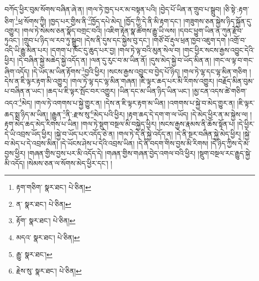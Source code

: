 བཀོད་ཕྱིར་བུམ་སོགས་བཞིན་ཞེ་ན། །གལ་ཏེ་ཁྱད་པར་མ་བསྟན་པའི། །བྱེད་པོ་ཡིན་ན་གྲུབ་པ་སྒྲུབ། །ཅི་སྟེ་:རྟག་ཅིག་\footnote{རྟག་གཅིག་  སྣར་ཐང་།  པེ་ཅིན། }ཕྲ་སོགས་ཀྱི། །ཁྱད་པར་གྱིས་ནི་\footnote{ན་  སྣར་ཐང་།  པེ་ཅིན། }ཁྱོད་དཔེ་མེད། །ཁྱོད་ཀྱི་དེ་ནི་མི་རྟག་དང་། །གཟུགས་ཅན་སྐྱེས་ཉིད་སྐྱོན་དུ་འགྱུར། །གལ་ཏེ་སེམས་ཅན་སྣོད་བགྲང་བའི། །འཇིག་རྟེན་སྣ་ཚོགས་རྒྱུ་ཡི་ལས། །དབང་ཕྱུག་ཡིན་ན་ཀུན་རྫོབ་ཏུའང་། །གྲུབ་པ་ཉིད་ལ་རབ་ཏུ་སྒྲུབ། །དེས་ནི་དུས་དང་སྐྱེས་བུ་དང་། །གཙོ་བོ་རྡུལ་ཕྲན་ཁྱབ་འཇུག་དག །འགྲོ་བ་འདི་ཡི་རྒྱུ་མིན་པར། །དགག་པ་ཁོང་དུ་ཆུད་པར་བྱ། །གལ་ཏེ་ལྟ་བའི་མུན་སེལ་བ། །གང་ཕྱིར་སངས་རྒྱས་འབྱུང་དེའི་ཕྱིར། །དེ་བཞིན་སྐྱེ་མཆེད་སྐྱེ་འདོད་ན། །ལན་དུ་རུང་བ་མ་ཡིན་ནོ། །དུས་མེད་སྐྱེ་བ་ཡོད་མིན་ན། །གང་ལ་ལྟ་བ་གང་ཞིག་འདོད། །དེ་ཡོད་མ་ཡིན་རྟོགས་\footnote{རྟོག་  སྣར་ཐང་།  པེ་ཅིན། }བྱའི་ཕྱིར། །སངས་རྒྱས་འབྱུང་བ་བྱེད་པོ་ཉིད། །གལ་ཏེ་ལྷ་དང་ལྷ་མིན་གཅིག །དེས་ན་ཇི་ལྟར་རྟག་མི་འགྱུར། །གལ་ཏེ་ལྷ་དང་ལྷ་མིན་གཞན། །ཇི་ལྟར་ཆད་པར་མི་རིགས་འགྱུར། །བརྗོད་མིན་བུམ་པ་བཞིན་ན་ཡང་། །ཆད་པ་ཇི་ལྟར་སྤོང་བར་འགྱུར། །ཡིན་དང་མ་ཡིན་ཉིད་ཡིན་ཡང་། །མྱ་ངན་འདས་ཚེ་གཅིག་འདའ་\footnote{མདའ་  སྣར་ཐང་།  པེ་ཅིན། }མེད། །གལ་ཏེ་འགགས་པ་སྐྱེ་གྱུར་ན། །དེས་ན་ཇི་ལྟར་རྟག་མ་ཡིན། །འགགས་པ་སྐྱེ་བ་མེད་གྱུར་ན། །ཇི་ལྟར་ཆད་སྨྲ་ཉིད་མ་ཡིན། །རྒྱུན་\footnote{རྒྱུ་  སྣར་ཐང་། }ནི་:རྫས་སུ་\footnote{རྗེས་སུ་  སྣར་ཐང་།  པེ་ཅིན། }མེད་པའི་ཕྱིར། །རྟག་ཆད་དེ་དག་ག་ལ་ཡོད། །དེ་མེད་ཕྱིར་ན་མ་སྐྱེས་ལ། །རྟག་མེད་ཆད་མེད་རིགས་པ་ཡིན། །གལ་ཏེ་སྡུག་བསྔལ་མི་བསྐྱེད་ཕྱིར། །སངས་རྒྱས་རྣམས་ནི་ཆོས་སྟོན་པ། །དེ་ཕྱིར་དེ་ཡི་འབྲས་ཡོད་ཕྱིར། །སྐྱེ་བ་ཡོད་པར་འདོད་ཅེ་ན། །གལ་ཏེ་དེ་ནི་སྐྱེ་འདོད་ན། །དེ་ནི་སྔར་བཞིན་སྐྱེ་མེད་ཕྱིར། །སྐྱེ་བ་མེད་པ་དེ་འབྲས་མིན། །དེ་ཡོངས་ཤེས་པ་དེའི་འབྲས་ཡིན། །དེ་ནི་བདག་གིས་བྱས་མི་རིགས། །དེ་ཉིད་ཀྱིས་དེ་མ་བྱས་ཕྱིར། །གཞན་གྱིས་བྱས་པར་མི་འདོད་དེ། །གཞན་གྱིས་གཞན་བྱེད་འགལ་བའི་ཕྱིར། །སྡུག་བསྔལ་རང་རྒྱུད་སྐྱེ་མི་འདོད། །སེམས་ཅན་ལ་སོགས་མེད་ཕྱིར་དང་། །

